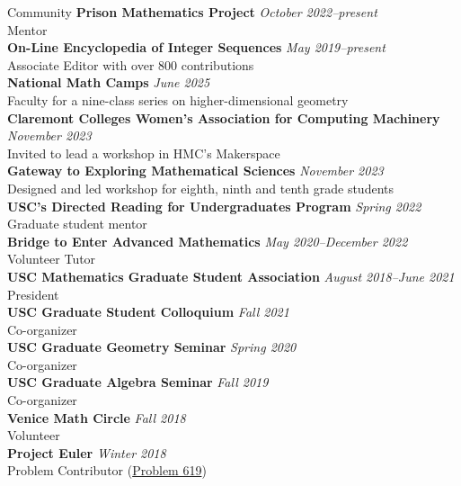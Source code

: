 \documentclass{cv} %
\begin{document}
\begin{rSection}{Community}
  \textbf{Prison Mathematics Project} \hfill \textit{October 2022--present}\\
  Mentor \\
  \textbf{On-Line Encyclopedia of Integer Sequences} \hfill \textit{May 2019--present}\\
  Associate Editor with over 800 contributions \\
  \textbf{National Math Camps} \hfill \textit{June 2025}\\
  Faculty for a nine-class series on higher-dimensional geometry \\
  \textbf{Claremont Colleges Women's Association for Computing Machinery} \hfill \textit{November 2023}\\
  Invited to lead a workshop in HMC's Makerspace\\
  \textbf{Gateway to Exploring Mathematical Sciences} \hfill \textit{November 2023}\\
  Designed and led workshop for eighth, ninth and tenth grade students\\
  \textbf{USC's Directed Reading for Undergraduates Program} \hfill \textit{Spring 2022}\\
  Graduate student mentor \\
  \textbf{Bridge to Enter Advanced Mathematics} \hfill \textit{May 2020--December 2022}\\
  Volunteer Tutor \\
  \textbf{USC Mathematics Graduate Student Association} \hfill \textit{August 2018--June 2021}\\
  President \\
  \textbf{USC Graduate Student Colloquium} \hfill \textit{Fall 2021}\\
  Co-organizer \\
  \textbf{USC Graduate Geometry Seminar} \hfill \textit{Spring 2020}\\
  Co-organizer \\
  \textbf{USC Graduate Algebra Seminar} \hfill \textit{Fall 2019}\\
  Co-organizer\\
  \textbf{Venice Math Circle} \hfill \textit{Fall 2018}\\
  Volunteer \\
  \textbf{Project Euler} \hfill \textit{Winter 2018}\\
  Problem Contributor (\href{https://projecteuler.net/problem=619}{Problem 619})
\end{rSection}
\end{document}
